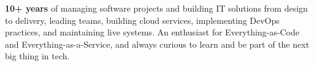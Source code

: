 
\begin{cvparagraph}
\textbf{10+ years} of managing software projects and building IT solutions from design to delivery, leading teams, building cloud services, implementing DevOps practices, and maintaining live systems. An enthusiast for Everything-as-Code and Everything-as-a-Service, and always curious to learn and be part of the next big thing in tech.
\end{cvparagraph}
